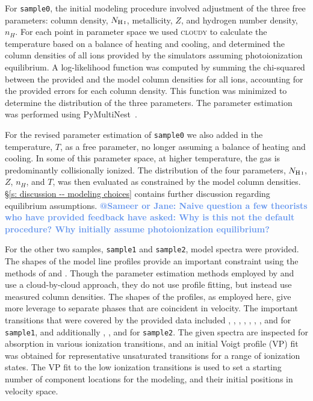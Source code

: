 \documentclass[fleqn,usenatbib]{mnras}
\makeatletter
\newcommand{\atsameer}[1]{\textcolor{CornflowerBlue}{\textbf{@Sameer or Jane: #1}}}
\makeatother
\begin{document}
For \texttt{sample0}, the initial modeling procedure involved adjustment of the three free parameters:
 column density, $N_{\ion{H}{I}}$, metallicity, $Z$, and hydrogen number density, $n_H$.
For each point in parameter space we used \textsc{cloudy} to calculate the temperature based on a balance of heating and cooling,
and determined the column densities of all ions provided by the simulators assuming photoionization equilibrium.
A log-likelihood function was computed by summing the chi-squared between the provided and the model column densities for all ions, accounting for the provided errors for each column density.
This function was minimized to determine the distribution of the three parameters.
The parameter estimation was performed using PyMultiNest~\citep{buchner2014Statistical}. 

For the revised parameter estimation of \texttt{sample0} we also added in the temperature, $T$, as a free parameter, no longer assuming a balance of heating and cooling.
In some of this parameter space, at higher temperature, the gas is predominantly collisionally ionized.
The distribution of the four parameters, $N_{\ion{H}{I}}$, $Z$, $n_H$, and $T$, was then evaluated as constrained by the model column densities.
\S\ref{s: discussion -- modeling choices} contains further discussion regarding equilibrium assumptions.
\atsameer{Naive question a few theorists who have provided feedback have asked: Why is this not the default procedure? Why initially assume photoionization equilibrium?}

For the other two samples, \texttt{sample1} and \texttt{sample2}, model spectra were provided.
The shapes of the model line profiles provide an important constraint using the methods of \cite{sameer2021Cloudbycloud} and \cite{sameer2022Probing}.
Though the  parameter estimation methods employed by \cite{zahedy2019Probing} and \cite{haislmaier2021COS} use a cloud-by-cloud approach, they do not use profile fitting, but instead use measured column densities.
The shapes of the profiles, as employed here, give more leverage to separate phases that are coincident in velocity.
The important transitions that were covered by the provided  data included , , , , , , , and  for \texttt{sample1}, and additionally , , and  for \texttt{sample2}.
The given spectra are inspected for absorption in various ionization transitions, and an initial Voigt profile (VP) fit was obtained for representative unsaturated transitions for a range of ionization states.
The VP fit to the low ionization transitions is used to set a starting number of component locations for the modeling, and their initial positions in velocity space.
\end{document}
